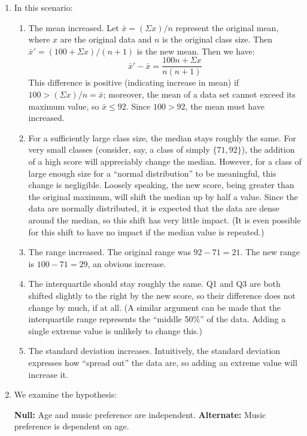 \documentclass{article}
\begin{document}
\begin{enumerate}
  \item In this scenario:
    \begin{enumerate}
      \item The mean increased. Let $\bar{x} = (\Sigma x)/n$ represent the original mean, where $x$ are the original data and $n$ is the original class size. Then $\bar{x}' = (100 + \Sigma x)/(n+1)$ is the new mean. Then we have:
        \begin{equation}
          \bar{x}' - \bar{x} = \frac{100n + \Sigma x}{n(n+1)}
        \end{equation}
      This difference is positive (indicating increase in mean) if $100 > (\Sigma x)/n = \bar{x}$; moreover, the mean of a data set cannot exceed its maximum value, so $\bar{x} \le 92$. Since $100 > 92$, the mean must have increased.
      \item For a sufficiently large class size, the median stays roughly the same. For very small classes (consider, say, a class of simply $\{71, 92\}$), the addition of a high score will appreciably change the median. However, for a class of large enough size for a ``normal distribution'' to be meaningful, this change is negligible. Loosely speaking, the new score, being greater than the original maximum, will shift the median up by half a value. Since the data are normally distributed, it is expected that the data are dense around the median, so this shift has very little impact. (It is even possible for this shift to have no impact if the median value is repeated.)
      \item The range increased. The original range was $92-71=21$. The new range is $100-71=29$, an obvious increase.
      \item The interquartile should stay roughly the same. Q1 and Q3 are both shifted slightly to the right by the new score, so their difference does not change by much, if at all. (A similar argument can be made that the interquartile range represents the ``middle 50\%'' of the data. Adding a single extreme value is unlikely to change this.)
      \item The standard deviation increases. Intuitively, the standard deviation expresses how ``spread out'' the data are, so adding an extreme value will increase it.
    \end{enumerate}

  \item We examine the hypothesis:

    \textbf{Null:} Age and music preference are independent. \newline
    \textbf{Alternate:} Music preference is dependent on age.


\end{enumerate}
\end{document}
